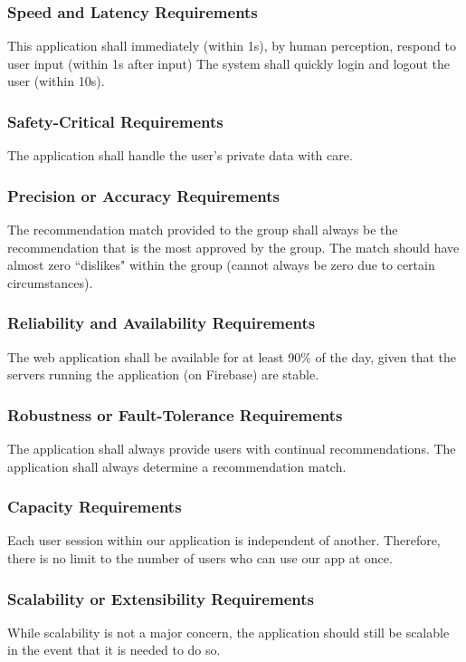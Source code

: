 \documentclass[12pt]{article}
\begin{document}
\subsubsection{Speed and Latency Requirements}
This application shall immediately (within 1s), by human perception, respond to user input (within 1s after input) The system shall quickly login and logout the user (within 10s).

\subsubsection{Safety-Critical Requirements}
The application shall handle the user's private data with care. 

\subsubsection{Precision or Accuracy Requirements}
The recommendation match provided to the group shall always be the recommendation that is the most approved by the group. The match should have almost zero ``dislikes" within the group (cannot always be zero due to certain circumstances). 

\subsubsection{Reliability and Availability Requirements}
The web application shall be available for at least 90\% of the day, given that the servers running the application (on Firebase) are stable.

\subsubsection{Robustness or Fault-Tolerance Requirements}
The application shall always provide users with continual recommendations. The application shall always determine a recommendation match.

\subsubsection{Capacity Requirements}
Each user session within our application is independent of another. Therefore, there is no limit to the number of users who can use our app at once.

\subsubsection{Scalability or Extensibility Requirements}
While scalability is not a major concern, the application should still be scalable in the event that it is needed to do so. 
\end{document}
